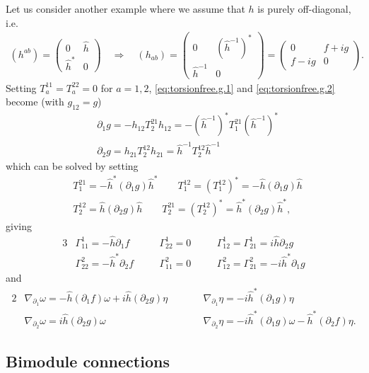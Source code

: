 \documentclass{amsart}
\newcommand{\spacearound}[1]{\quad#1\quad}
\renewcommand{\implies}{\spacearound{\Rightarrow}}
\theoremstyle{definition}
\theoremstyle{remark}
\numberwithin{equation}{section}
\renewcommand{\d}{\partial}
\newcommand{\hh}{\hat{h}}
\newcommand{\hhi}{\hh^{-1}}
\begin{document}
\noindent
Let us consider another example where we assume that $h$ is purely off-diagonal, i.e.
\begin{align*}
  (h^{ab}) =
  \begin{pmatrix}
    0 & \hh \\
    \hh^\ast & 0
  \end{pmatrix}\implies
               (h_{ab}) = 
               \begin{pmatrix}
                 0 & (\hhi)^\ast\\
                 \hhi & 0
               \end{pmatrix}=                       
                        \begin{pmatrix}
                          0 & f+ig\\
                          f-ig & 0
                        \end{pmatrix}.
\end{align*}
Setting $T^{11}_a=T^{22}_a=0$ for $a=1,2$, \eqref{eq:torsionfree.g.1}
and \eqref{eq:torsionfree.g.2} become (with $g_{12}=g$)
\begin{align*}
  &\d_1g = -h_{12}T^{21}_2h_{12} = -(\hhi)^\ast T^{21}_1(\hhi)^\ast\\
  &\d_2g = h_{21}T^{12}_2h_{21} = \hhi T^{12}_2\hhi
\end{align*}
which can be solved by setting
\begin{align*}
  &T^{21}_1 = -\hh^\ast(\d_1g)\hh^\ast \qquad
    T^{12}_1=(T^{12}_1)^\ast = -\hh(\d_1g)\hh\\
  &T^{12}_2 = \hh(\d_2g)\hh\qquad
    T^{21}_2 = (T^{12}_2)^\ast = \hh^\ast(\d_2g)\hh^\ast,
\end{align*}
giving
\begin{alignat*}{3}
  &\Gamma^1_{11} = -\hh\d_1f
  &\quad &\Gamma^1_{22}= 0 
  &\quad&\Gamma^1_{12}=\Gamma^1_{21}=i\hh\d_2g\\
  &\Gamma^2_{22} = -\hh^\ast\d_2f 
  & &\Gamma^2_{11} = 0 
  & & \Gamma^2_{12}=\Gamma^2_{21}=-i\hh^\ast\d_1g 
\end{alignat*}
and
\begin{alignat*}{2}
  &\nabla_{\d_1}\omega = -\hh(\d_1f)\omega + i\hh(\d_2g)\eta &\qquad
  &\nabla_{\d_1}\eta = -i\hh^\ast (\d_1g)\eta\\
  &\nabla_{\d_2}\omega = i\hh(\d_2g)\omega &
  &\nabla_{\d_2}\eta = -i\hh^\ast(\d_1g)\omega - \hh^\ast(\d_2f)\eta.
\end{alignat*}

\subsection{Bimodule connections}
\end{document}
